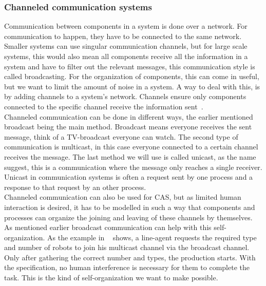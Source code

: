 \subsubsection{Channeled communication systems}
Communication between components in a system is done over a network. For communication to happen, they have to be connected to the same network. Smaller systems can use singular communication channels, but for large scale systems, this would also mean all components receive all the information in a system and have to filter out the relevant messages, this communication style is called broadcasting. For the organization of components, this can come in useful, but we want to limit the amount of noise in a system. A way to deal with this, is by adding channels to a system's network. Channels ensure only components connected to the specific channel receive the information sent~\cite{busetta2002channeled}.
\\
Channeled communication can be done in different ways, the earlier mentioned broadcast being the main method. Broadcast means everyone receives the sent message, think of a TV-broadcast everyone can watch. The second type of communication is multicast, in this case everyone connected to a certain channel receives the message. The last method we will use is called unicast, as the name suggest, this is a communication where the message only reaches a single receiver. Unicast in communication systems is often a request sent by one process and a response to that request by an other process.
\\ 
Channeled communication can also be used for CAS, but as limited human interaction is desired, it has to be modelled in such a way that components and processes can organize the joining and leaving of these channels by themselves. As mentioned earlier broadcast communication can help with this self-organization. As the example in ~\cite{abd2021modelling} shows, a line-agent requests the required type and number of robots to join his multicast channel via the broadcast channel. Only after gathering the correct number and types, the production starts. With the specification, no human interference is necessary for them to complete the task. This is the kind of self-organization we want to make possible. 
\\

